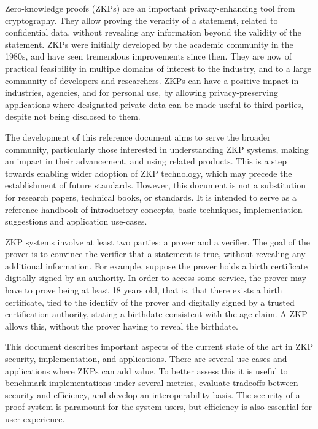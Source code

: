 \label{sec:prelim:executive-summary}


	

	Zero-knowledge proofs (ZKPs) are an important privacy-enhancing tool from cryptography. 
	They allow proving the veracity of a statement, related to confidential data, without revealing any information beyond the validity of the statement.
  ZKPs were initially developed by the academic community in the 1980s, and have seen tremendous improvements since then.
	They are now of practical feasibility in multiple domains of interest to the industry, and to a large community of developers and researchers.  
  ZKPs can have a positive impact in industries, agencies, and for personal use, by allowing privacy-preserving applications where designated private data can be made useful to third parties, despite not being disclosed to them.


	The development of this reference document aims to serve the broader community, particularly those interested in understanding ZKP systems, making an impact in their advancement, and using related products.
	This is a step towards enabling wider adoption of ZKP technology, which may precede the establishment of future standards.
	However, this document is not a substitution for research papers, technical books, or standards. 
	It is intended to serve as a reference handbook of introductory concepts, basic techniques, implementation suggestions and application use-cases. 


	ZKP systems involve at least two parties: a prover and a verifier.  
	The goal of the prover is to convince the verifier that a statement is true, without revealing any additional information.  
	For example, suppose the prover holds a birth certificate digitally signed by an authority.
	In order to access some service, the prover may have to prove being at least 18 years old, that is, that there exists a birth certificate, tied to the identify of the prover and digitally signed by a trusted certification authority, stating a birthdate consistent with the age claim.
	A ZKP allows this, without the prover having to reveal the birthdate.


	This document describes important aspects of the current state of the art in ZKP security, implementation, and applications.
	There are several use-cases and applications where ZKPs can add value.
	To better assess this it is useful to benchmark implementations under several metrics, evaluate tradeoffs between security and efficiency, and develop an interoperability basis.
    The security of a proof system is paramount for the system users, but efficiency is also essential for user experience.


